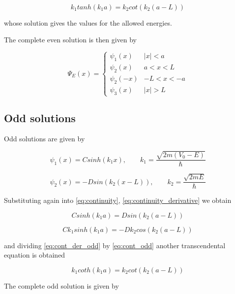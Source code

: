 \documentclass{article}
\begin{document}
\begin{equation}
\label{eq:trans_even}
k_{1} tanh(k_{1}a) = k_{2} cot(k_{2}(a-L))
\end{equation}

whose solution gives the values for the allowed energies.

The complete even solution is then given by

\begin{equation}
\Psi_{E}(x) = 
  \begin{cases} 
      \psi_{1}(x) & \left|x\right| < a \\
      \psi_{2}(x) & a < x < L \\
      \psi_{2}(-x) & -L < x < -a \\
      \psi_{3}(x) & \left|x\right| > L
   \end{cases}
\end{equation}

\subsection{Odd solutions}
Odd solutions are given by

\begin{equation}
\psi_{1}(x) = C sinh(k_{1} x), \qquad k_{1} = \frac{\sqrt{2m(V_{0} - E)}}{\hbar}
\end{equation}

\begin{equation}
\psi_{2}(x) = - D sin(k_{2}(x-L)), \qquad k_{2} = \frac{\sqrt{2mE}}{\hbar}
\end{equation}

Substituting again into \eqref{eq:continuity}, \eqref{eq:continuity_derivative} we obtain

\begin{equation}
\label{eq:cont_odd}
C sinh(k_{1}a) =  D sin(k_{2}(a-L))
\end{equation}

\begin{equation}
\label{eq:cont_der_odd}
C k_{1} sinh(k_{1}a) =  - D k_{2} cos(k_{2}(a-L))
\end{equation}

and dividing \eqref{eq:cont_der_odd} by \eqref{eq:cont_odd} another transcendental equation is obtained

\begin{equation}
\label{eq:trans_odd}
k_{1} coth(k_{1}a) = k_{2} cot(k_{2}(a-L))
\end{equation}

The complete odd solution is given by
\end{document}
